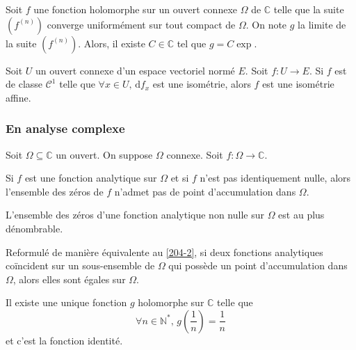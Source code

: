 	\begin{example}
		Soit $f$ une fonction holomorphe sur un ouvert connexe $\Omega$ de $\mathbb{C}$ telle que la suite $(f^{(n)})$ converge uniformément sur tout compact de $\Omega$. On note $g$ la limite de la suite $(f^{(n)})$. Alors, il existe $C \in \mathbb{C}$ tel que $g = C\exp$.
	\end{example}


	\begin{proposition}
		Soit $U$ un ouvert connexe d'un espace vectoriel normé $E$. Soit $f : U \rightarrow E$. Si $f$ est de classe $\mathcal{C}^1$ telle que $\forall x \in U, \, \mathrm{d}f_x$ est une isométrie, alors $f$ est une isométrie affine.
	\end{proposition}

	\subsubsection{En analyse complexe}


	Soit $\Omega \subseteq \mathbb{C}$ un ouvert. On suppose $\Omega$ connexe. Soit $f : \Omega \rightarrow \mathbb{C}$.

	\begin{theorem}
		\label{204-2}
		Si $f$ est une fonction analytique sur $\Omega$ et si $f$ n'est pas identiquement nulle, alors l'ensemble des zéros de $f$ n'admet pas de point d'accumulation dans $\Omega$.
	\end{theorem}

	\begin{corollary}
		L'ensemble des zéros d'une fonction analytique non nulle sur $\Omega$ est au plus dénombrable.
	\end{corollary}

	\begin{remark}
		Reformulé de manière équivalente au \cref{204-2}, si deux fonctions analytiques coïncident sur un sous-ensemble de $\Omega$ qui possède un point d'accumulation dans $\Omega$, alors elles sont égales sur $\Omega$.
	\end{remark}


	\begin{example}
		Il existe une unique fonction $g$ holomorphe sur $\mathbb{C}$ telle que
		\[ \forall n \in \mathbb{N}^*, \, g\left( \frac{1}{n} \right) = \frac{1}{n} \]
		et c'est la fonction identité.
	\end{example}

